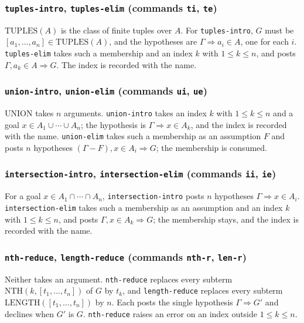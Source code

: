 \subsubsection*{\texttt{tuples-intro}, \texttt{tuples-elim}
  (commands \texttt{ti}, \texttt{te})}

$\mathrm{TUPLES}(A)$ is the class of finite tuples over $A$.  For
\texttt{tuples-intro}, $G$ must be
$[a_1, \ldots, a_n] \in \mathrm{TUPLES}(A)$, and the hypotheses are
$\Gamma \Longrightarrow a_i \in A$, one for each $i$.
\texttt{tuples-elim} takes such a membership and an index $k$ with
$1 \leq k \leq n$, and posts
$\Gamma, a_k \in A \Longrightarrow G$.  The index is recorded with the
name.

\subsubsection*{\texttt{union-intro}, \texttt{union-elim}
  (commands \texttt{ui}, \texttt{ue})}

$\mathrm{UNION}$ takes $n$ arguments.  \texttt{union-intro} takes an
index $k$ with $1 \leq k \leq n$ and a goal
$x \in A_1 \cup \cdots \cup A_n$; the hypothesis is
$\Gamma \Longrightarrow x \in A_k$, and the index is recorded with the
name.  \texttt{union-elim} takes such a membership as an assumption $F$
and posts $n$ hypotheses $(\Gamma - F), x \in A_i \Longrightarrow G$; the
membership is consumed.

\subsubsection*{\texttt{intersection-intro}, \texttt{intersection-elim}
  (commands \texttt{ii}, \texttt{ie})}

For a goal $x \in A_1 \cap \cdots \cap A_n$, \texttt{intersection-intro}
posts $n$ hypotheses $\Gamma \Longrightarrow x \in A_i$.
\texttt{intersection-elim} takes such a membership as an assumption and
an index $k$ with $1 \leq k \leq n$, and posts
$\Gamma, x \in A_k \Longrightarrow G$; the membership stays, and the
index is recorded with the name.

\subsubsection*{\texttt{nth-reduce}, \texttt{length-reduce}
  (commands \texttt{nth-r}, \texttt{len-r})}

Neither takes an argument.  \texttt{nth-reduce} replaces every subterm
$\mathrm{NTH}(k, [t_1, \ldots, t_n])$ of $G$ by $t_k$, and
\texttt{length-reduce} replaces every subterm
$\mathrm{LENGTH}([t_1, \ldots, t_n])$ by $n$.  Each posts the single
hypothesis $\Gamma \Longrightarrow G'$ and declines when $G'$ is $G$.
\texttt{nth-reduce} raises an error on an index outside
$1 \leq k \leq n$.


